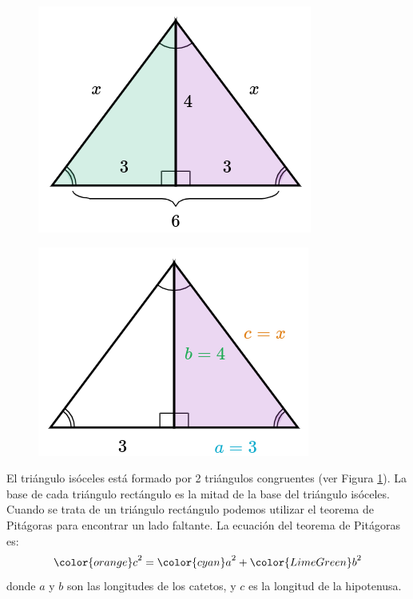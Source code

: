 \begin{solutionbox}{11cm}
    \begin{minipage}{0.3\textwidth}
        \begin{figure}[H]
            \centering
            \includegraphics[width=0.6\linewidth]{../images/pitagoras2a.png}
            \caption{}
            \label{fig:pitagoras_2a}
        \end{figure}
        \begin{figure}[H]
            \centering
            \includegraphics[width=0.6\linewidth]{../images/pitagoras2b.png}
            \caption{}
            \label{fig:pitagoras_2b}
        \end{figure}
    \end{minipage}\hfill
    \begin{minipage}{0.65\textwidth}
        El triángulo isóceles está formado por 2 triángulos congruentes (ver Figura \ref{fig:pitagoras_2a}).
        La base de cada triángulo rectángulo es la mitad de la base del triángulo isóceles.
        Cuando se trata de un triángulo rectángulo podemos utilizar el teorema de Pitágoras para encontrar un lado faltante.
        La ecuación del teorema de Pitágoras es:
        \[{\color{orange}c}^2={\color{cyan}a}^2+{\color{LimeGreen}b}^2\]
        donde $a$ y $b$ son las longitudes de los catetos, y $c$ es la longitud de la hipotenusa.

\end{minipage}
\end{solutionbox}

